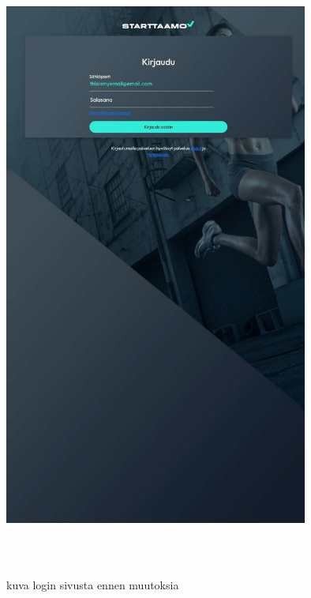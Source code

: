 \documentclass[11pt,a4paper,titlepage,oneside]{article}
\begin{document}

\includegraphics[width=10cm, height=20cm]{src/public/loginnormal.jpg} \\
\medskip

kuva login sivusta ennen muutoksia
\medskip
\end{document}
